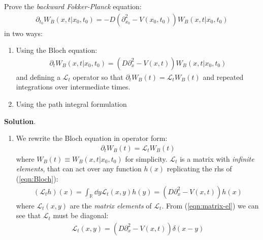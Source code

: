 \documentclass[../template.tex]{subfiles}
\begin{document}
\begin{exo}
    Prove the \textit{backward Fokker-Planck} equation:
    \begin{align*}
        \partial_{t_0} W_B(x,t|x_0,t_0) = -D(\partial_{x_0}^2 - V(x_0,t_0)) W_B(x,t|x_0,t_0) 
    \end{align*} 
    in two ways:
    \begin{enumerate}
        \item Using the Bloch equation:
        \begin{align}\label{eqn:Bloch}
            \partial_t W_B(x,t|x_0,t_0) = (D\partial_x^2 - V(x,t)) W_B(x,t|x_0,t_0)
        \end{align}
        and defining a $\mathcal{L}_t$ operator so that $\partial_t W_B(t) = \mathcal{L}_t W_B(t)$ and repeated integrations over intermediate times.
        \item Using the path integral formulation
    \end{enumerate}    
    
    \medskip

    \textbf{Solution}.
    
    \begin{enumerate}
        \item We rewrite the Bloch equation in operator form:
        \begin{align} \label{eqn:time-ev}
            \partial_t W_B(t) = \mathcal{L}_t W_B(t)
        \end{align}
        where $W_B(t) \equiv W_B(x,t|x_0,t_0)$ for simplicity. $\mathcal{L}_t$ is a matrix with \textit{infinite elements}, that can act over any function $h(x)$ replicating the rhs of (\ref{eqn:Bloch}):
        \begin{align} \label{eqn:matrix-el}
            (\mathcal{L}_t h)(x) = \int_{\mathbb{R}} \dd{y} \mathcal{L}_t(x,y)h(y) = (D\partial_x^2 - V(x,t)) h(x)
        \end{align}
        where $\mathcal{L}_t(x,y)$ are the \textit{matrix elements} of $\mathcal{L}_t$. From (\ref{eqn:matrix-el}) we can see that $\mathcal{L}_t$ must be diagonal:
        \begin{align} \label{eqn:mtx-el}
            \mathcal{L}_t(x,y) = (D\partial_x^2 - V(x,t)) \delta(x-y)
        \end{align}

        \medskip


\end{enumerate}
\end{exo}
\end{document}
